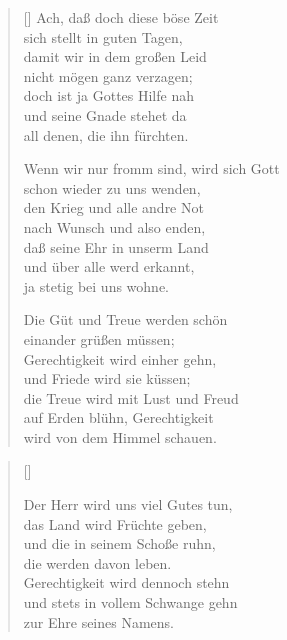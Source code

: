 \begin{multicols}{2}
\begin{verse}[\versewidth]
 Ach, daß doch diese böse Zeit\\
sich stellt in guten Tagen,\\
damit wir in dem großen Leid\\
nicht mögen ganz verzagen;\\
doch ist ja Gottes Hilfe nah\\
und seine Gnade stehet da\\
all denen, die ihn fürchten.

 Wenn wir nur fromm sind, wird sich Gott\\
schon wieder zu uns wenden,\\
den Krieg und alle andre Not\\
nach Wunsch und also enden,\\
daß seine Ehr in unserm Land\\
und über alle werd erkannt,\\
ja stetig bei uns wohne.

 Die Güt und Treue werden schön\\
einander grüßen müssen;\\
Gerechtigkeit wird einher gehn,\\
und Friede wird sie küssen;\\
die Treue wird mit Lust und Freud\\
auf Erden blühn, Gerechtigkeit\\
wird von dem Himmel schauen.

\end{verse}
\end{multicols}

\begin{center}
\settowidth{\versewidth}{Der Herr wird uns viel Gutes tun,}
\begin{verse}[\versewidth]

 Der Herr wird uns viel Gutes tun,\\
das Land wird Früchte geben,\\
und die in seinem Schoße ruhn,\\
die werden davon leben.\\
Gerechtigkeit wird dennoch stehn\\
und stets in vollem Schwange gehn\\
zur Ehre seines Namens.

\end{verse}
\end{center}
